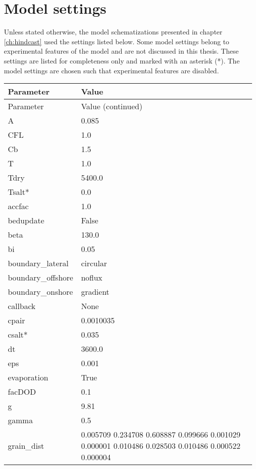 \chapter{Model settings}
\label{apx:modelsettings}

Unless stated otherwise, the model schematizations presented in
chapter \ref{ch:hindcast} used the settings listed below. Some model
settings belong to experimental features of the model and are not
discussed in this thesis. These settings are listed for completeness
only and marked with an asterisk (*). The model settings are chosen
such that experimental features are disabled.

\begin{longtable}{p{3cm} p{8cm}}
  Parameter         & Value \\
  \hline
  \endfirsthead
  Parameter         & Value \hfill (continued)\\
  \hline
  \endhead
  A                 & 0.085 \\
  CFL               & 1.0 \\
  Cb                & 1.5 \\
  T                 & 1.0 \\
  Tdry              & 5400.0 \\
  Tsalt*            & 0.0 \\
  accfac            & 1.0 \\
  bedupdate         & False \\
  beta              & 130.0 \\
  bi                & 0.05 \\
  boundary\_lateral  & circular \\
  boundary\_offshore & noflux \\
  boundary\_onshore  & gradient \\
  callback          & None \\
  cpair             & 0.0010035 \\
  csalt*            & 0.035 \\
  dt                & 3600.0 \\
  eps               & 0.001 \\
  evaporation       & True \\
  facDOD            & 0.1 \\
  g                 & 9.81 \\
  gamma             & 0.5 \\
  grain\_dist       & 0.005709 0.234708 0.608887 0.099666 0.001029 0.000001 0.010486 0.028503 0.010486 0.000522 0.000004 \\

\end{longtable}
